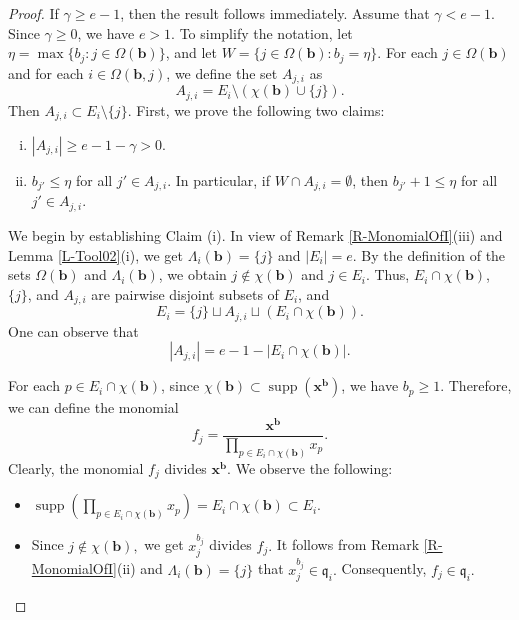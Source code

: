 \documentclass[12pt,reqno]{amsart}
\theoremstyle{definition}
\newcommand{\q}{\mathfrak{q}}
\newcommand{\x}{\mathbf{x}}
\newcommand{\bb}{\mathbf{b}}
\newcommand{\C}{\chi}
\newcommand{\Om}{\Omega}
\newcommand{\Lm}{\Lambda}
\newcommand{\supp}[1]{\operatorname{supp}\left(#1\right)}
\numberwithin{equation}{section}
\begin{document}
\begin{proof}
    If $\gamma \ge e - 1$, then the result follows immediately. Assume that $\gamma < e - 1.$ Since $\gamma \ge 0$, we have $e > 1.$ To simplify the notation, let $\eta = \max \{b_j : j \in \Om(\bb)\}$, and let $W = \{j \in \Om(\bb) : b_j = \eta\}.$ For each $j \in \Om(\bb)$ and for each $i \in \Om(\bb, j)$, we define the set $A_{j, i}$ as
    \[A_{j, i} = E_i \setminus (\C(\bb) \cup \{j\}).\]
    Then $A_{j, i} \subset E_i \setminus \{j\}.$ First, we prove the following two claims:
    \begin{enumerate}[(i)]
        \item $|A_{j, i}| \ge e - 1 - \gamma > 0.$

        \item $b_{j'} \le \eta$ for all $j' \in A_{j, i}.$ In particular, if $W \cap A_{j, i} = \emptyset$, then $b_{j'} + 1 \le \eta$ for all $j' \in A_{j, i}.$
    \end{enumerate}
    
    We begin by establishing Claim (i). In view of Remark \ref{R-MonomialOfI}(iii) and Lemma \ref{L-Tool02}(i), we get $\Lm_i(\bb) = \{j\}$ and $|E_i| = e.$ By the definition of the sets $\Om(\bb)$ and $\Lm_i(\bb)$, we obtain $j \notin \C(\bb)$ and $j \in E_i.$ Thus, $E_i \cap \C(\bb)$, $\{j\}$, and $A_{j, i}$ are pairwise disjoint subsets of $E_i$, and
    \[E_i = \{j\} \sqcup A_{j, i} \sqcup (E_i \cap \C(\bb)).\]
    One can observe that
    \begin{equation}\label{EQN-Cardinality}
        |A_{j, i}| = e - 1 - |E_i \cap \C(\bb)|.
    \end{equation}
    
    For each $p \in E_i \cap \C(\bb)$, since $\C(\bb) \subset \supp{\x^{\bb}}$, we have $b_p \ge 1.$ Therefore, we can define the monomial
    \[f_j = \dfrac{\x^{\bb}}{\prod\limits_{p \in E_i \cap \C(\bb)} x_p}.\]
    Clearly, the monomial $f_j$ divides $\x^{\bb}.$ We observe the following:
    \vspace{2mm}
    \begin{itemize}
        \item $\supp{\prod\limits_{p \in E_i \cap \C(\bb)} x_p} = E_i \cap \C(\bb) \subset E_i.$

        \vspace{2.5mm}
        
        \item Since $j \notin \C(\bb),$ we get  $x_j^{b_j}$ divides $f_j.$ It follows from Remark \ref{R-MonomialOfI}(ii) and $\Lm_i(\bb) = \{j\}$ that $x_j^{b_j} \in \q_i.$ Consequently, $f_j \in \q_i.$
        

\end{itemize}
\end{proof}
\end{document}
